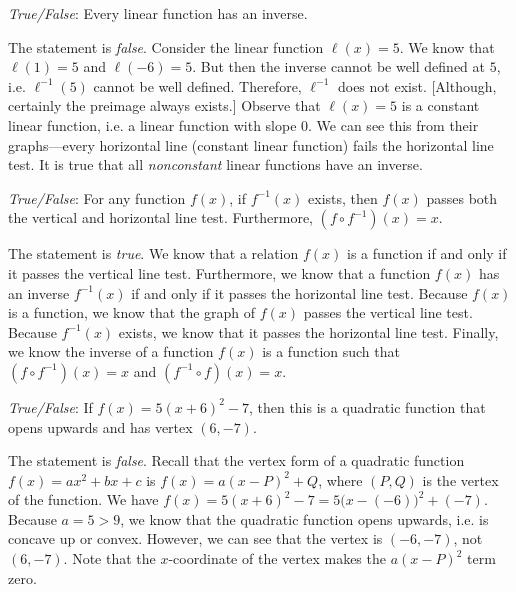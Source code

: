 \documentclass[11pt,letterpaper]{article}
\begin{document}
\quizsol \textit{True/False}: Every linear function has an inverse. \pspace

\sol The statement is \textit{false}. Consider the linear function $\ell(x)= 5$. We know that $\ell(1)= 5$ and $\ell(-6)= 5$. But then the inverse cannot be well defined at $5$, i.e. $\ell^{-1}(5)$ cannot be well defined. Therefore, $\ell^{-1}$ does not exist. [Although, certainly the preimage always exists.] Observe that $\ell(x)= 5$ is a constant linear function, i.e. a linear function with slope $0$. We can see this from their graphs---every horizontal line (constant linear function) fails the horizontal line test. It is true that all \textit{nonconstant} linear functions have an inverse. \pvspace{1.5cm}



\quizsol \textit{True/False}: For any function $f(x)$, if $f^{-1}(x)$ exists, then $f(x)$ passes both the vertical and horizontal line test. Furthermore, $(f \circ f^{-1})(x)= x$. \pspace

\sol The statement is \textit{true}. We know that a relation $f(x)$ is a function if and only if it passes the vertical line test. Furthermore, we know that a function $f(x)$ has an inverse $f^{-1}(x)$ if and only if it passes the horizontal line test. Because $f(x)$ is a function, we know that the graph of $f(x)$ passes the vertical line test. Because $f^{-1}(x)$ exists, we know that it passes the horizontal line test. Finally, we know the inverse of a function $f(x)$ is a function such that $(f \circ f^{-1})(x)= x$ and $(f^{-1} \circ f)(x)= x$. \pvspace{1.5cm}



\quizsol \textit{True/False}: If $f(x)= 5(x + 6)^2 - 7$, then this is a quadratic function that opens upwards and has vertex $(6, -7)$. \pspace

\sol The statement is \textit{false}. Recall that the vertex form of a quadratic function $f(x)= ax^2 + bx + c$ is $f(x)= a(x - P)^2 + Q$, where $(P, Q)$ is the vertex of the function. We have $f(x)= 5(x + 6)^2 - 7= 5 \big(x - (-6) \big)^2 + (-7)$. Because $a= 5 > 9$, we know that the quadratic function opens upwards, i.e. is concave up or convex. However, we can see that the vertex is $(-6, -7)$, not $(6, -7)$. Note that the $x$-coordinate of the vertex makes the $a(x - P)^2$ term zero. \pvspace{1.5cm}





\newpage
\end{document}
